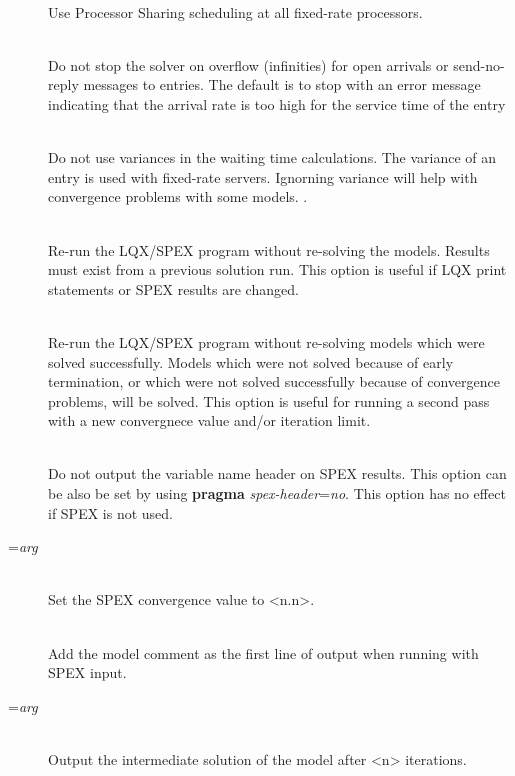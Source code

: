\begin{description}
\item[]~\\
Use Processor Sharing scheduling at all fixed-rate processors.
\item[]~\\
Do not stop the solver on overflow (infinities) for open arrivals or send-no-reply messages to entries.  The default is to stop with an
error message indicating that the arrival rate is too high for the service time of the entry
\item[]~\\
Do not use variances in the waiting time calculations.
The variance of an entry is used with fixed-rate servers.
Ignorning variance will help with convergence problems with some models. .
\item[]~\\
Re-run the LQX/SPEX program without re-solving the models.  Results must exist from a previous solution run.
This option is useful if LQX print statements or SPEX results are changed.
\item[]~\\
Re-run the LQX/SPEX program without re-solving models which were solved successfully.
Models which were not solved because of early termination, or which were not solved successfully because of convergence problems, will be solved.
This option is useful for running a second pass with a new convergnece value and/or iteration limit.
\item[]~\\
Do not output the variable name header on SPEX results.
This option can be also be set by using \textbf{pragma} \emph{spex-header}=\emph{no}.
This option has no effect if SPEX is not used.
\item[=\emph{arg}]~\\
Set the SPEX convergence value to <n.n>.
\item[]~\\
Add the model comment as the first line of output when running with SPEX input.
\item[=\emph{arg}]~\\
Output the intermediate solution of the model after <n> iterations.
\item[]~\\

\end{description}
